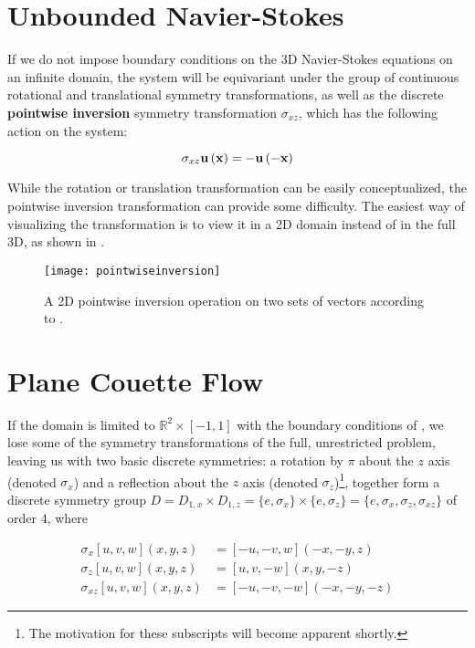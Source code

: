 \section{Unbounded Navier-Stokes}

If we do not impose boundary conditions on the 3D Navier-Stokes equations on an infinite domain, the system will be equivariant under the group of continuous rotational and translational symmetry transformations, as well as the discrete {\bf pointwise inversion} symmetry transformation $\sigma_{xz}$, which has the following action on the system:

\begin{equation}\label{eq:pointwiseinversion}
\sigma_{xz}\mathbf{u}\left ( \mathbf{x} \right ) = -\mathbf{u}\left ( -\mathbf{x} \right )
\end{equation}

While the rotation or translation transformation can be easily conceptualized, the pointwise inversion transformation can provide some difficulty. The easiest way of visualizing the transformation is to view it in a 2D domain instead of in the full 3D, as shown in . 

\begin{figure}[h]
\texttt{[image: pointwiseinversion]}
\caption{A 2D pointwise inversion operation on two sets of vectors according to .}\label{fig:pointwiseinversion}

\end{figure}


\section{Plane Couette Flow}

If the domain is limited to $\mathbb{R}^2 \times [-1,1]$ with the boundary conditions of \pCf, we lose some of the symmetry transformations of the full, unrestricted problem, leaving us with two basic discrete symmetries: a rotation by $\pi$ about the $z$ axis (denoted $\sigma_x$) and a reflection about the $z$ axis (denoted $\sigma_z$)\footnote{The motivation for these subscripts will become apparent shortly.}, together form a discrete symmetry group $D = D_{1,x} \times D_{1,z} = \{e,\sigma_x\} \times \{e,\sigma_z\}= \{e, \sigma_x,\sigma_z,\sigma_{xz}\}$ of order 4, where

\begin{align}\label{eq:discretesymm}
\sigma_x [u,v,w](x,y,z) &= [-u,-v,w](-x,-y,z)\\
\sigma_z [u,v,w](x,y,z) &= [u,v,-w](x,y,-z)\\
\sigma_{xz} [u,v,w](x,y,z) &= [-u,-v,-w](-x,-y,-z)
\end{align}

